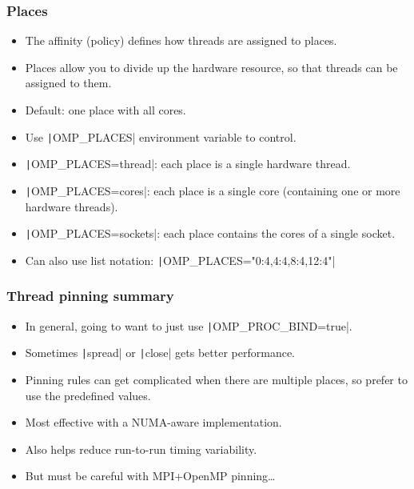 \documentclass{beamer}
\begin{document}
\begin{frame}
\frametitle{Places}
\begin{itemize}
  \item The affinity (policy) defines how threads are assigned to places.
  \item Places allow you to divide up the hardware resource, so that threads can be assigned to them.
  \item Default: one place with all cores.
  \item Use \texttt|OMP_PLACES| environment variable to control.
  \item \texttt|OMP_PLACES=thread|: each place is a single hardware thread.
  \item \texttt|OMP_PLACES=cores|: each place is a single core (containing one or more hardware threads).
  \item \texttt|OMP_PLACES=sockets|: each place contains the cores of a single socket.
  \item Can also use list notation: \texttt|OMP_PLACES="{0:4},{4:4},{8:4},{12:4}"|
\end{itemize}
\end{frame}

\begin{frame}
\frametitle{Thread pinning summary}
\begin{itemize}
  \item In general, going to want to just use \texttt|OMP_PROC_BIND=true|.
  \item Sometimes \texttt|spread| or \texttt|close| gets better performance.
  \item Pinning rules can get complicated when there are multiple places, so prefer to use the predefined values.
  \item Most effective with a NUMA-aware implementation.
  \item Also helps reduce run-to-run timing variability.
  \item But must be careful with MPI+OpenMP pinning\dots
\end{itemize}
\end{frame}

\end{document}
